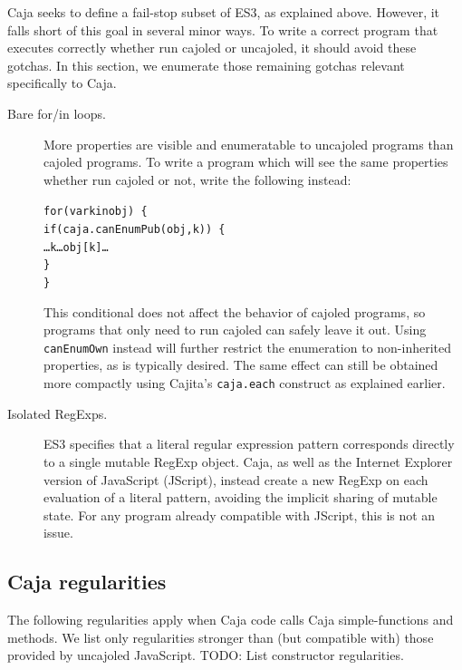\documentclass[letterpaper,twocolumn,10pt]{article}
\newcommand{\code}[1]{{\tt {#1}}}              %
\begin{document}
Caja seeks to define a fail-stop subset of ES3, as explained above. However, 
it falls short of this goal in several minor ways. To write a correct program 
that executes correctly whether run cajoled or uncajoled, it should 
avoid these gotchas. In this section, we enumerate those remaining gotchas
relevant specifically to Caja.

\begin{description}

  \item[Bare for/in loops.] More properties are visible and enumeratable to 
  uncajoled programs than cajoled programs. To write a program which 
  will see the same properties whether run cajoled or not, write the 
  following instead:
%
\begin{alltt}
for (var k in obj)\ \{ 
  if (caja.canEnumPub(obj,k))\ \{
    {\ldots}k{\ldots}obj[k]\ldots
  \}
\}
\end{alltt}
%
  This conditional does not affect the behavior of cajoled programs, so
  programs that only need to run cajoled can safely leave it out. Using
  \code{canEnumOwn} instead will further restrict the enumeration to
  non-inherited properties, as is typically desired. The same effect can still
  be obtained more compactly using Cajita's \code{caja.each} construct as
  explained earlier.

  \item[Isolated RegExps.] ES3 specifies that a literal regular expression 
  pattern corresponds directly to a single mutable RegExp object. Caja, as 
  well as the Internet Explorer version of JavaScript (JScript), instead 
  create a new RegExp on each evaluation of a literal pattern, avoiding the 
  implicit sharing of mutable state. For any program already compatible with 
  JScript, this is not an issue.
    
\end{description}

\subsection{Caja regularities}

The following regularities apply when Caja code calls Caja simple-functions 
and methods. We list only regularities stronger than (but compatible with) 
those provided by uncajoled JavaScript. TODO: List constructor regularities.
\end{document}
